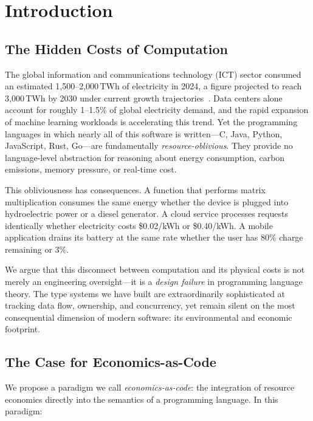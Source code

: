 \documentclass[11pt,a4paper]{article}
\begin{document}
\section{Introduction}
\label{sec:introduction}

\subsection{The Hidden Costs of Computation}

The global information and communications technology (ICT) sector consumed an
estimated 1,500--2,000\,TWh of electricity in 2024, a figure projected to reach
3,000\,TWh by 2030 under current growth trajectories~\cite{jones2018,
masanet2020}.  Data centers alone account for roughly 1--1.5\% of global
electricity demand, and the rapid expansion of machine learning workloads is
accelerating this trend.  Yet the programming languages in which nearly all of
this software is written---C, Java, Python, JavaScript, Rust, Go---are
fundamentally \emph{resource-oblivious}.  They provide no language-level
abstraction for reasoning about energy consumption, carbon emissions, memory
pressure, or real-time cost.

This obliviousness has consequences.  A function that performs matrix
multiplication consumes the same energy whether the device is plugged into
hydroelectric power or a diesel generator.  A cloud service processes requests
identically whether electricity costs \$0.02/kWh or \$0.40/kWh.  A mobile
application drains its battery at the same rate whether the user has 80\% charge
remaining or 3\%.

We argue that this disconnect between computation and its physical costs is not
merely an engineering oversight---it is a \emph{design failure} in programming
language theory.  The type systems we have built are extraordinarily
sophisticated at tracking data flow, ownership, and concurrency, yet remain
silent on the most consequential dimension of modern software: its environmental
and economic footprint.

\subsection{The Case for Economics-as-Code}

We propose a paradigm we call \emph{economics-as-code}: the integration of
resource economics directly into the semantics of a programming language.  In
this paradigm:
\end{document}
